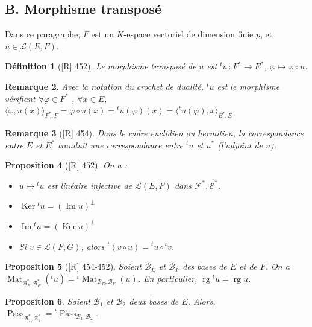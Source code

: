\documentclass[10pt, a4paper, parskip=full, twoside, twocolumn]{report}
\newtheorem{definition}{Définition}
\newtheorem{proposition}[definition]{Proposition}
\newtheorem{remark}[definition]{Remarque}
\newcommand{\B}{\mathcal{B}}
\DeclareMathOperator{\im}{Im}
\DeclareMathOperator{\rg}{rg}
\DeclareMathOperator{\Ker}{Ker}
\DeclareMathOperator{\Mat}{Mat}
\DeclareMathOperator{\Pass}{Pass}
\begin{document}
\subsection*{B. Morphisme transposé}
\textcolor{paragraphtext}{Dans ce paragraphe, $F$ est un $K$-espace vectoriel de dimension finie $p$, et $u\in\mathcal{L}(E,F)$.}

\begin{definition}[\textnormal{[R] 452}]
	Le morphisme \emph{transposé de $u$} est ${}^tu\,\colon F^*\to E^*$, $\varphi\mapsto \varphi\circ u$.
\end{definition}

\begin{remark}
	Avec la notation du crochet de dualité, ${}^tu$ est le morphisme vérifiant $\forall \varphi\in F^*$
	, $\forall x\in E$, $\langle\varphi, u(x)\rangle_{F^*,F} = \varphi\circ u (x) = {}^tu(\varphi)(x) = \langle {}^tu(\varphi),x\rangle_{E^*,E}$.
\end{remark}

\begin{remark}[\textnormal{[R] 454}]
	Dans le cadre euclidien ou hermitien, la correspondance entre $E$ et $E^*$ tranduit une correspondance entre ${}^tu$ et $u^*$ (l'adjoint de $u$).
\end{remark}

\begin{proposition}[\textnormal{[R] 452}]
	On a :
	\begin{itemize}
		\item $u\mapsto {}^tu$ est linéaire injective de $\mathcal{L}(E,F)$ dans $\mathcal{F^*,E^*}$.
		\item $\Ker {}^tu = \left(\im u\right)^{\perp}$
		\item $\im {}^tu = \left(\Ker u\right)^{\perp}$
		\item Si $v\in\mathcal{L}(F,G)$, alors ${}^t\left(v\circ u\right) = {}^tu\circ{}^tv$.
	\end{itemize}
\end{proposition}

\begin{proposition}[\textnormal{[R] 454-452}]
	Soient $\B_E$ et $\B_F$ des bases de $E$ et de $F$. On a $\Mat_{\B_F^*,\B_E^*}({}^tu) = {}^t\Mat_{\B_E,\B_F}(u)$.
	En particulier, $\rg {}^tu = \rg u$.
\end{proposition}

\begin{proposition}
	Soient $\B_1$ et $\B_2$ deux bases de $E$. Alors, $\Pass_{\B_2^*,\B_1^*} = {}^t\Pass_{\B_1,\B_2}$.
\end{proposition}
\end{document}
